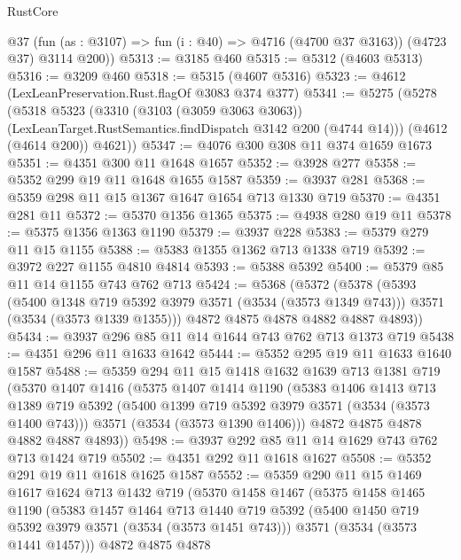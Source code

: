 \begin{lexlean}{RustCore}
\begin{coremodule}
        @37
        (fun (as : @3107) => fun (i : @40) => @4716 (@4700 @37 @3163))
        (@4723 @37)
        @3114
        @200))
@5313 := @3185 @460
@5315 := @5312 (@4603 @5313)
@5316 := @3209 @460
@5318 := @5315 (@4607 @5316)
@5323 := @4612 (LexLeanPreservation.Rust.flagOf @3083 @374 @377)
@5341 := @5275
    (@5278
      (@5318
        @5323
        (@3310
          (@3103 (@3059 @3063 @3063))
          (LexLeanTarget.RustSemantics.findDispatch @3142 @200 (@4744 @14)))
        (@4612 (@4614 @200))
        @4621))
@5347 := @4076 @300 @308 @11 @374 @1659 @1673
@5351 := @4351 @300 @11 @1648 @1657
@5352 := @3928 @277
@5358 := @5352 @299 @19 @11 @1648 @1655 @1587
@5359 := @3937 @281
@5368 := @5359 @298 @11 @15 @1367 @1647 @1654 @713 @1330 @719
@5370 := @4351 @281 @11
@5372 := @5370 @1356 @1365
@5375 := @4938 @280 @19 @11
@5378 := @5375 @1356 @1363 @1190
@5379 := @3937 @228
@5383 := @5379 @279 @11 @15 @1155
@5388 := @5383 @1355 @1362 @713 @1338 @719
@5392 := @3972 @227 @1155 @4810 @4814
@5393 := @5388 @5392
@5400 := @5379 @85 @11 @14 @1155 @743 @762 @713
@5424 := @5368
    (@5372
      (@5378
        (@5393
          (@5400 @1348 @719 @5392 @3979 @3571 (@3534 (@3573 @1349 @743)))
          @3571
          (@3534 (@3573 @1339 @1355)))
        @4872
        @4875
        @4878
        @4882
        @4887
        @4893))
@5434 := @3937 @296 @85 @11 @14 @1644 @743 @762 @713 @1373 @719
@5438 := @4351 @296 @11 @1633 @1642
@5444 := @5352 @295 @19 @11 @1633 @1640 @1587
@5488 := @5359
    @294
    @11
    @15
    @1418
    @1632
    @1639
    @713
    @1381
    @719
    (@5370
      @1407
      @1416
      (@5375
        @1407
        @1414
        @1190
        (@5383
          @1406
          @1413
          @713
          @1389
          @719
          @5392
          (@5400 @1399 @719 @5392 @3979 @3571 (@3534 (@3573 @1400 @743)))
          @3571
          (@3534 (@3573 @1390 @1406)))
        @4872
        @4875
        @4878
        @4882
        @4887
        @4893))
@5498 := @3937 @292 @85 @11 @14 @1629 @743 @762 @713 @1424 @719
@5502 := @4351 @292 @11 @1618 @1627
@5508 := @5352 @291 @19 @11 @1618 @1625 @1587
@5552 := @5359
    @290
    @11
    @15
    @1469
    @1617
    @1624
    @713
    @1432
    @719
    (@5370
      @1458
      @1467
      (@5375
        @1458
        @1465
        @1190
        (@5383
          @1457
          @1464
          @713
          @1440
          @719
          @5392
          (@5400 @1450 @719 @5392 @3979 @3571 (@3534 (@3573 @1451 @743)))
          @3571
          (@3534 (@3573 @1441 @1457)))
        @4872
        @4875
        @4878

\end{coremodule}
\end{lexlean}
